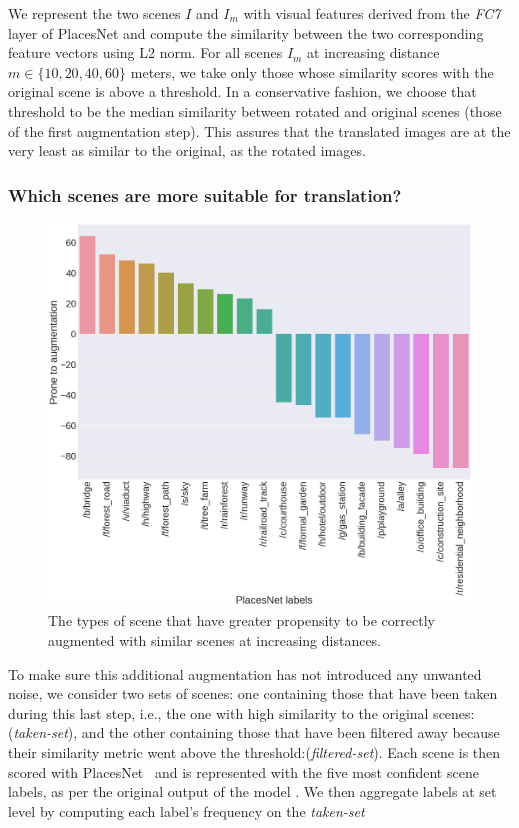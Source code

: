 We represent the two scenes $I$ and $I_m$ with visual features derived from the \textsl{FC7} layer of PlacesNet and compute the similarity between the two corresponding feature vectors using L2 norm. 
For all scenes $I_m$ at increasing distance $m \in \{10,20,40,60\}$ meters,  we take only those whose similarity scores with the original scene is above a threshold. In a conservative fashion, we choose that threshold to be the median similarity between rotated and original scenes (those of the first augmentation step). This assures that the translated images are at the very least as similar to the original, as the rotated images.


\subsubsection{Which scenes are more suitable for translation?}
\begin{figure}[t!]
    \centering
    \includegraphics[width=\columnwidth]{SimilarityPlacesPrevalence.png}
    \caption{The types of scene that have greater propensity to be correctly augmented with similar scenes at increasing distances.}
    \label{fig:augmentationSimilarity}
\end{figure}
To make sure this additional augmentation has not introduced any unwanted noise, we consider  two sets of scenes: one containing those that have been taken during this last step, i.e., the one with high similarity to the original scenes:(\emph{taken-set}), and the other containing those that have been filtered away because their similarity metric went above the threshold:(\emph{filtered-set}). Each scene is then scored with PlacesNet~\cite{zhou2014learning} and is represented with the five most confident scene labels, as per the original output of the model . We then aggregate labels at set level by computing each label's frequency on the \emph{taken-set} 
